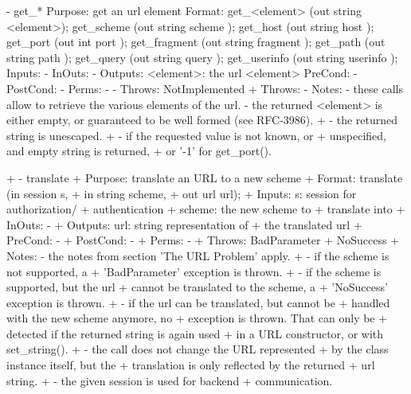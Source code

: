 \begin{myspec}
 
    - get_*
      Purpose:  get an url element
      Format:   get_<element>       (out string <element>);
                get_scheme          (out string scheme   );
                get_host            (out string host     );
                get_port            (out int    port     );
                get_fragment        (out string fragment );
                get_path            (out string path     );
                get_query           (out string query    );
                get_userinfo        (out string userinfo );
      Inputs:   -
      InOuts:   -
      Outputs:  <element>:           the url <element>
      PreCond:  -
      PostCond: -
      Perms:    -
-     Throws:   NotImplemented
+     Throws:   -
      Notes:    - these calls allow to retrieve the various
                  elements of the url.  
                - the returned <element> is either empty, or 
                  guaranteed to be well formed (see RFC-3986).
+               - the returned string is unescaped.
+               - if the requested value is not known, or 
+                 unspecified, and empty string is returned, 
+                 or '-1' for get_port().
 
 
+   - translate
+     Purpose:  translate an URL to a new scheme
+     Format:   translate            (in  session s, 
+                                     in  string  scheme,
+                                     out url     url);
+     Inputs:   s:                    session for authorization/
+                                     authentication
+               scheme:               the new scheme to
+                                     translate into
+     InOuts:   -
+     Outputs:  url:                  string representation of
+                                     the translated url
+     PreCond:  -
+     PostCond: -
+     Perms:    -
+     Throws:   BadParameter
+               NoSuccess
+     Notes:    - the notes from section 'The URL Problem' apply.
+               - if the scheme is not supported,  a
+                 'BadParameter' exception is thrown.
+               - if the scheme is supported, but the url
+                 cannot be translated to the scheme, a
+                 'NoSuccess' exception is thrown.
+               - if the url can be translated, but cannot be
+                 handled with the new scheme anymore, no
+                 exception is thrown.  That can only be
+                 detected if the returned string is again used
+                 in a URL constructor, or with set_string().
+               - the call does not change the URL represented
+                 by the class instance itself, but the
+                 translation is only reflected by the returned
+                 url string.
+               - the given session is used for backend
+                 communication.


\end{myspec}
